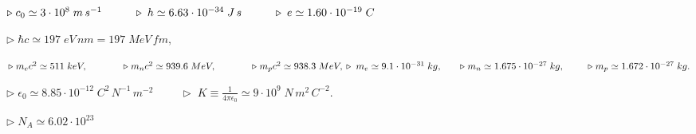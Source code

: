 \documentclass[a4paper,12pt]{exam}
\begin{document}
	
\vspace*{-2ex}

\vspace{\fill}
		
\begin{learn}
{
 $\triangleright\;c_0\simeq 3\cdot 10^8\;m\,s^{-1} \hspace{1cm} \triangleright\; h\simeq 6.63\cdot 10^{-34}\;J\,s \hspace*{1cm}\triangleright\; e\simeq 1.60\cdot 10^{-19}\;C$
  \vspace{2ex}
  
  $%
  \triangleright\;\hbar c\simeq 197\;eV\,nm= 197\;MeV\,f\!m,$
  \vspace{2ex}
  
  $\triangleright\;m_ec^2\simeq 511\;keV,\hspace{1.3cm} \triangleright\;m_nc^2\simeq 939.6\;MeV,\hspace{1.3cm} \triangleright\;m_pc^2\simeq 938.3\;MeV,
  \newline
  \triangleright\; m_e\simeq 9.1\cdot 10^{-31}\;kg,\hspace{.65cm}\triangleright\; m_n\simeq1.675\cdot 10^{-27}\;kg,\hspace{.85cm}\triangleright\;m_p\simeq1.672\cdot 10^{-27}\;kg.$
   \vspace{1ex}
   
  $\triangleright\;\epsilon_0\simeq 8.85\cdot 10^{-12}\;C^2\,N^{-1}\,m^{-2}
  \hspace{1cm} \triangleright\;K\equiv\frac{1}{4\pi\epsilon_0}\simeq 9\cdot 10^9\;N\,m^2\,C^{-2}.$
  \vspace{1ex}
  
  $\triangleright\;N_A\simeq 6.02\cdot 10^{23}$

 
  
  
 

 
 }
\end{learn}
\end{document}

